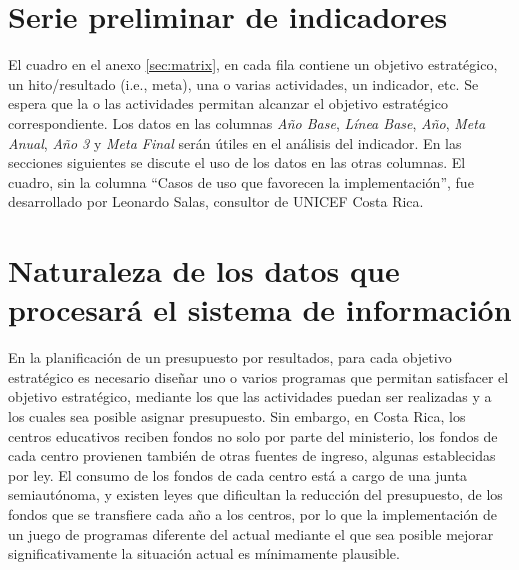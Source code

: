 \documentclass{article}
\begin{document}
\begin{multicols}{6}[]
\section{Serie preliminar de indicadores}

El cuadro en el anexo \ref{sec:matrix}, en cada fila contiene un objetivo estrat\'egico, un hito/resultado (i.e., meta), una o varias actividades, un indicador, etc. Se espera que la o las actividades permitan alcanzar el objetivo estrat\'egico correspondiente. Los datos en las columnas \emph{A\~no Base}, \emph{L\'inea Base}, \emph{A\~no}, \emph{Meta Anual}, \emph{A\~no 3} y \emph{Meta Final} ser\'an \'utiles en el an\'alisis del indicador. En las secciones siguientes se discute el uso de los datos en las otras columnas. El cuadro, sin la columna ``Casos de uso que favorecen la implementaci\'on'', fue desarrollado por Leonardo Salas, consultor de UNICEF Costa Rica.

\section{Naturaleza de los datos que procesar\'a el sistema de informaci\'on} \label{sec:data}


En la planificaci\'on de un presupuesto por resultados, para cada objetivo estrat\'egico es necesario dise\~nar uno o varios programas que permitan satisfacer el objetivo estrat\'egico, mediante los que las actividades puedan ser realizadas y a los cuales sea posible asignar presupuesto. Sin embargo, en Costa Rica, los centros educativos reciben fondos no solo por parte del ministerio, los fondos de cada centro provienen tambi\'en de otras fuentes de ingreso, algunas establecidas por ley. El consumo de los fondos de cada centro est\'a a cargo de una junta semiaut\'onoma, y existen leyes que dificultan la reducci\'on del presupuesto, de los fondos que se transfiere cada a\~no a los centros, por lo que la implementaci\'on de un juego de programas diferente del actual mediante el que sea posible mejorar significativamente la situaci\'on actual es m\'inimamente plausible.


\end{multicols}
\end{document}
